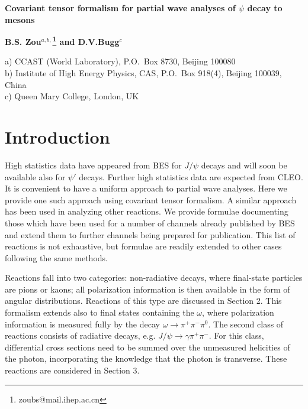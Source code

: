 
\textheight 20cm \textwidth 16cm
\oddsidemargin=-0.5cm \evensidemargin=-0.5cm

\begin{center}
{\Large\bf Covariant tensor formalism for partial wave analyses of
$\psi$ decay to mesons}
\vskip 0.5cm

{\large\bf B.S. Zou$^{a,b,}$\footnote{zoubs@mail.ihep.ac.cn} and
D.V.Bugg$^c$}

a) CCAST (World Laboratory), P.O.~Box 8730, Beijing 100080\\
b) Institute of High Energy Physics, CAS, P.O.~Box 918(4), Beijing 100039,
China\\
c) Queen Mary College, London, UK\\
\vskip 0.5cm
\end{center}

\begin{abstract}
$J/\psi$ and $\psi'$ decay to mesons are a good place to look for
glueballs, hybrids and for extracting strange and nonstrange
components in mesons. Abundant $J/\psi$ and $\psi'$ events have
been collected at the Beijing Electron Positron Collider (BEPC).
More data will be collected at upgraded BEPC and CLEO-C. Here we
provide explicit PWA formulae for many interesting channels in the
covariant tensor formalism.
\end{abstract}


\section{Introduction}

High statistics data have appeared from BES for $J/\psi$ decays
and will soon be available also for $\psi '$ decays. Further high
statistics data are expected from CLEO\cite{CLEO}. It is
convenient to have a uniform approach to partial wave analyses.
Here we provide one such approach using covariant tensor
formalism. A similar approach has been used in analyzing other
reactions\cite{Anisovich1,Anisovich2,Anisovich3}. We provide
formulae documenting those which have been used for a number of
channels already published by BES\cite{BES1,BES2,BES3,BES4,BES5}
and extend them to further channels being prepared for
publication. This list of reactions is not exhaustive, but
formulae are readily extended to other cases following the same
methods.

Reactions fall into two categories: non-radiative decays, where
final-state particles are pions or kaons; all polarization
information is then available in the form of angular
distributions. Reactions of this type are discussed in Section 2.
This formalism extends also to final states containing the
$\omega$, where polarization information is measured fully by the
decay $\omega \to \pi ^+ \pi ^- \pi ^0$. The second class of
reactions consists of radiative decays, e.g. $J/\psi  \to \gamma
\pi ^+\pi ^-$. For this class,  differential cross sections need
to be summed over the unmeasured helicities of the photon,
incorporating the knowledge that the photon is transverse. These
reactions are considered in Section 3.

